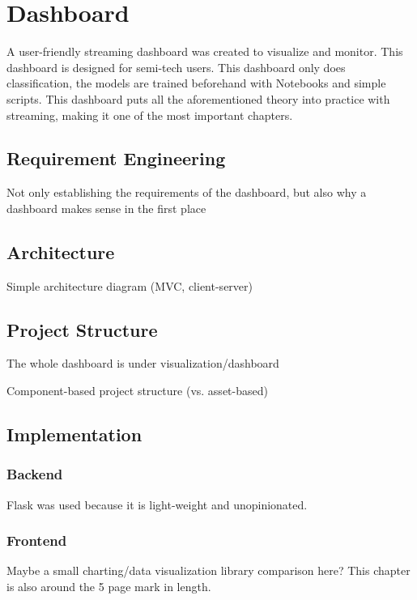 \chapter{Dashboard}

\label{ch:dashboard}

A user-friendly streaming dashboard was created to visualize and monitor.
This dashboard is designed for semi-tech users.
This dashboard only does classification, the models are trained beforehand with Notebooks and simple scripts.
This dashboard puts all the aforementioned theory into practice with streaming, making it one of the most important chapters.

\section{Requirement Engineering}
\label{sec:requirementEngineering}

Not only establishing the requirements of the dashboard, but also why a dashboard makes sense in the first place

\section{Architecture}
\label{sec:architecture}

Simple architecture diagram (MVC, client-server)

\section{Project Structure}
\label{sec:projectStructure}

The whole dashboard is under visualization/dashboard

Component-based project structure (vs. asset-based)

\section{Implementation}
\label{sec:implementation}

\subsection{Backend}
\label{subsec:backend}

Flask was used because it is light-weight and unopinionated.

\subsection{Frontend}
\label{subsec:frontend}

Maybe a small charting/data visualization library comparison here?
This chapter is also around the 5 page mark in length.
\pagebreak[5]